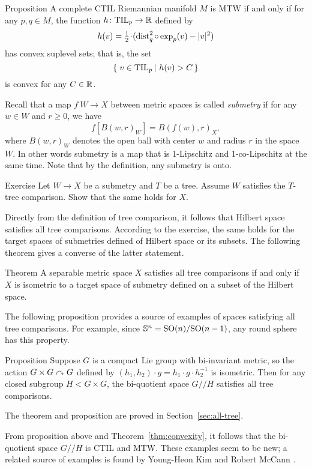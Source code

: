 \begin{thm}{Proposition}\label{prop:convexity}
A complete CTIL Riemannian manifold $M$ is MTW if and only if 
for any $p,q\in M$, the function $h\colon \mathrm{\rm TIL}_p\to \mathbb{R}$ defined by
\[h(v)=\tfrac12\cdot(\dist_q^2\circ\exp_p(v)-|v|^2)\] 
has convex suplevel sets; that is, the set
\[\set{v\in\TIL_p}{h(v)> C}\]
is convex for any $C\in\mathbb{R}$.
\end{thm}


Recall that a map $f\:W\to X$ between metric spaces is called \emph{submetry} if for any $w\in W$ and $r\ge 0$, we have 
\[f[B(w,r)_W]=B(f(w),r)_X,\]
where $B(w,r)_W$ denotes the open ball with center $w$ and radius $r$ in the space $W$.
In other words submetry is a map that is 1-Lipschitz and 1-co-Lipschitz at the same time.
Note that by the definition, any submetry is onto.

\begin{thm}{Exercise}
Let $W\to X$ be a submetry and $T$ be a tree.
Assume $W$ satisfies the $T$-tree comparison.
Show that the same holds for $X$.
\end{thm}

Directly from the definition of tree comparison, it follows that Hilbert space satisfies all tree comparisons.
According to the exercise, the same holds for the target spaces of submetries defined of Hilbert space or its subsets.
The following theorem gives a converse of the latter statement.


\begin{thm}{Theorem}\label{thm:hilbert-quotient}
A separable metric space $X$ satisfies all tree comparisons if and only if
$X$ is isometric to a target space of submetry defined on a subset  of the Hilbert space.
\end{thm} %

The following proposition provides a source of examples of spaces satisfying all tree comparisons.
For example, since $\mathbb{S}^n=\mathrm{SO}(n)/\mathrm{SO}(n-1)$, any round sphere has this property.

\begin{thm}{Proposition}\label{prop:group}
Suppose $G$ is a compact Lie group with bi-invariant metric, so the action $G\times G\curvearrowright G$ defined by $(h_1,h_2)\cdot g=h_1\cdot g\cdot  h_2^{-1}$ is isometric. 
Then for any closed subgroup $H<G\times G$, the bi-quotient space $G/\!\!/H$ satisfies all tree comparisons.
\end{thm}

The theorem and proposition are proved in Section~\ref{sec:all-tree}.

From proposition above and Theorem~\ref{thm:convexity}, it follows that the bi-quotient space $G/\!\!/H$ is CTIL and MTW.
These examples seem to be new; a related source of examples is found by Young-Heon Kim and Robert McCann \cite{kim-mccann}.

